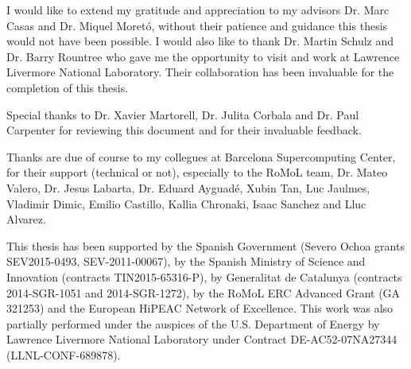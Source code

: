 
\begin{acknowledgements}
	I would like to extend my gratitude and appreciation to my advisors Dr.
	Marc Casas and Dr. Miquel Moret\'{o}, without their patience and
	guidance this thesis would not have been possible.  I would also like to 
	thank Dr. Martin Schulz and Dr. Barry Rountree who gave me the opportunity 
	to visit and work at Lawrence Livermore National Laboratory.  Their collaboration
	has been invaluable for the completion of this thesis.

	Special thanks to Dr. Xavier Martorell, Dr. Julita Corbala and Dr. Paul Carpenter
	for reviewing this document and for their invaluable feedback.

	Thanks are due of course to my collegues at Barcelona Supercomputing Center,
	for their support (technical or not), especially to the RoMoL team, Dr. Mateo Valero,
	Dr. Jesus Labarta, Dr. Eduard Ayguad\'{e}, Xubin Tan, Luc Jaulmes, Vladimir Dimic, 
	Emilio Castillo, Kallia Chronaki, Isaac Sanchez and Lluc Alvarez.
	
	This thesis has been supported by the Spanish Government (Severo Ochoa grants
	SEV2015-0493, SEV-2011-00067), by the Spanish Ministry of Science and
	Innovation (contracts TIN2015-65316-P), by Generalitat de Catalunya
	(contracts 2014-SGR-1051 and 2014-SGR-1272), by the RoMoL ERC Advanced
	Grant (GA 321253) and the European HiPEAC Network of Excellence.  This
	work was also partially performed under the auspices of the U.S.
	Department of Energy by Lawrence Livermore National Laboratory under
	Contract DE-AC52-07NA27344 (LLNL-CONF-689878).
\end{acknowledgements}
